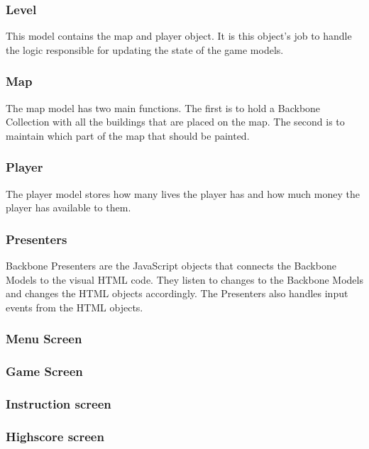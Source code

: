 	\subsubsection*{Level}
	This model contains the map and player object. It is this object's job to handle the logic responsible for 
	updating the state of the game models.
	\subsubsection*{Map}
	The map model has two main functions. The first is to hold a Backbone Collection with all the buildings 
	that are placed on the map. The second is to maintain which part of the map that should be painted.
	\subsubsection*{Player} 
	The player model stores how many lives the player has and how much money the player has available to them.

\subsubsection*{Presenters}
	Backbone Presenters are the JavaScript objects that connects the Backbone Models to the visual HTML code. 
	They listen to changes to the Backbone Models and changes the HTML objects accordingly. The Presenters also 
	handles input events from the HTML objects.
	\subsubsection*{Menu Screen}

	\subsubsection*{Game Screen}
	\subsubsection*{Instruction screen}
	\subsubsection*{Highscore screen}

